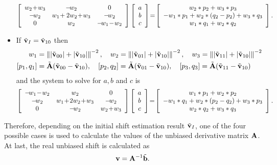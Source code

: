 \begin{itemize}[leftmargin=*]
	\begin{align}
	\left[\begin{array}{c c c}w_2\!+\!w_3 & -\!w_2 &0\\ -\!w_2 & w_1\!+2w_2\!+\!w_3 & -\!w_2\\ 0 &w_2 &-\!w_1\!-\!w_2\end{array}\right] 
	\left[\begin{array}{c}a \\ b \\ c\end{array}\right]
	\!=\! \left[\begin{array}{c}w_2*p_2 + w_3*p_3\\-w_1*p_1 + w_2*(q_2-p_2)+w_3*q_3\\w_1*q_1+w_2*q_2\end{array}\right].
	\end{align}
	\item If $\tilde{\mathbf{v}}_I = \tilde{\mathbf{v}}_{10}$ then
	\begin{align}
	w_1 &= \left\lVert|\tilde{\mathbf{v}}_{00}| + |\tilde{\mathbf{v}}_{10}|\right\rVert^{-2}, \quad
	w_2 = \left\lVert|\tilde{\mathbf{v}}_{01}| + |\tilde{\mathbf{v}}_{10}|\right\rVert^{-2}, \quad
	w_3 = \left\lVert|\tilde{\mathbf{v}}_{11}| + |\tilde{\mathbf{v}}_{10}|\right\rVert^{-2}\\
	[p_1,q_1] &= \tilde{\mathbf{A}} (\tilde{\mathbf{v}}_{00} - \tilde{\mathbf{v}}_{10}), \quad
	[p_2,q_2] = \tilde{\mathbf{A}} (\tilde{\mathbf{v}}_{01} - \tilde{\mathbf{v}}_{10}), \quad
	[p_3,q_3] = \tilde{\mathbf{A}} (\tilde{\mathbf{v}}_{11} - \tilde{\mathbf{v}}_{10})
	\end{align}
	and the system to solve for $a,b$ and $c$ is
	\begin{align}
	\left[\begin{array}{c c c}-\!w_1\!-\!w_2 &w_2 &0\\ -\!w_2 &w_1\!+\!2w_2\!+\!w_3 &-\!w_2\\ 0 &-\!w_2 & w_2\!+\!w_3\end{array}\right] 
	\left[\begin{array}{c}a \\ b \\ c\end{array}\right]
	\!=\! 
	\left[\begin{array}{c}w_1*p_1 + w_2*p_2\\ -w_1*q_1+w_2*(p_2-q_2)+w_3*p_3\\ w_2*q_2+w_3*q_3\end{array}\right].
	\end{align}
\end{itemize}

Therefore, depending on the initial shift estimation result $\tilde{\mathbf{v}}_I$, one of the four possible cases is used to calculate the values of the unbiased derivative matrix $\mathbf{A}$. At last, the real unbiased shift is calculated as
\begin{equation}
\mathbf{v} = \mathbf{A}^{-1}\tilde{\mathbf{b}}.
\end{equation} 

